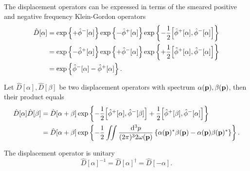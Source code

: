 \begin{lemma}\label{thm:displacement_operator_simplified}
	The displacement operators can be expressed in terms of the smeared positive and negative frequency Klein-Gordon operators
	\begin{equation}
		\begin{split}
			\hat{D}[\alpha]
			&=
			\exp\left\{
				+\hat\phi^-[\alpha]
			\right\}
			\exp\left\{
				-\hat\phi^+[\alpha]
			\right\}
			\exp\left\{
				-
				\frac{1}{2}
				\comm{\hat\phi^+[\alpha]}{\hat\phi^-[\alpha]}
			\right\}
			\\
			&=
			\exp\left\{
				-\hat\phi^+[\alpha]
			\right\}
			\exp\left\{
				+\hat\phi^-[\alpha]
			\right\}
			\exp\left\{
				+
				\frac{1}{2}
				\comm{\hat\phi^+[\alpha]}{\hat\phi^-[\alpha]}
			\right\}
			\\
			&=
			\exp\left\{
				\hat\phi^-[\alpha]
				-
				\hat\phi^+[\alpha]
			\right\}
			.
		\end{split}
	\end{equation}
\end{lemma}
\begin{lemma}\label{thm:displacement_operator_product}
	Let $\hat{D}[\alpha],\hat{D}[\beta]$ be two displacement operators with spectrum $\alpha(\vb{p}),\beta(\vb{p})$, then their product equals
	\begin{equation}
		\begin{split}
			\hat{D}[\alpha]
			\hat{D}[\beta]
			&=
			\hat{D}[\alpha+\beta]
			\exp\left\{
				-
				\frac{1}{2}
				\comm{\hat\phi^+[\alpha]}{\hat\phi^-[\beta]}
				+
				\frac{1}{2}
				\comm{\hat\phi^+[\beta]}{\hat\phi^-[\alpha]}
			\right\}
			\\
			&=
			\hat{D}[\alpha+\beta]
			\exp\left\{
				-
				\frac{1}{2}
				\iint\frac{\dd[3]{p}}{(2\pi)^32\omega(\vb{p})}
				\left\{
					\alpha(\vb{p})^*
					\beta(\vb{p})
					-
					\alpha(\vb{p})
					\beta(\vb{p})^*
				\right\}
			\right\}
			.
		\end{split}
	\end{equation}
\end{lemma}
\begin{lemma}\label{thm:displacement_operator_unitary}
	The displacement operator is unitary
	\begin{equation}
		\hat{D}[\alpha]^{-1}
		=
		\hat{D}[\alpha]^\dagger
		=
		\hat{D}[-\alpha]
		.
	\end{equation}
\end{lemma}
